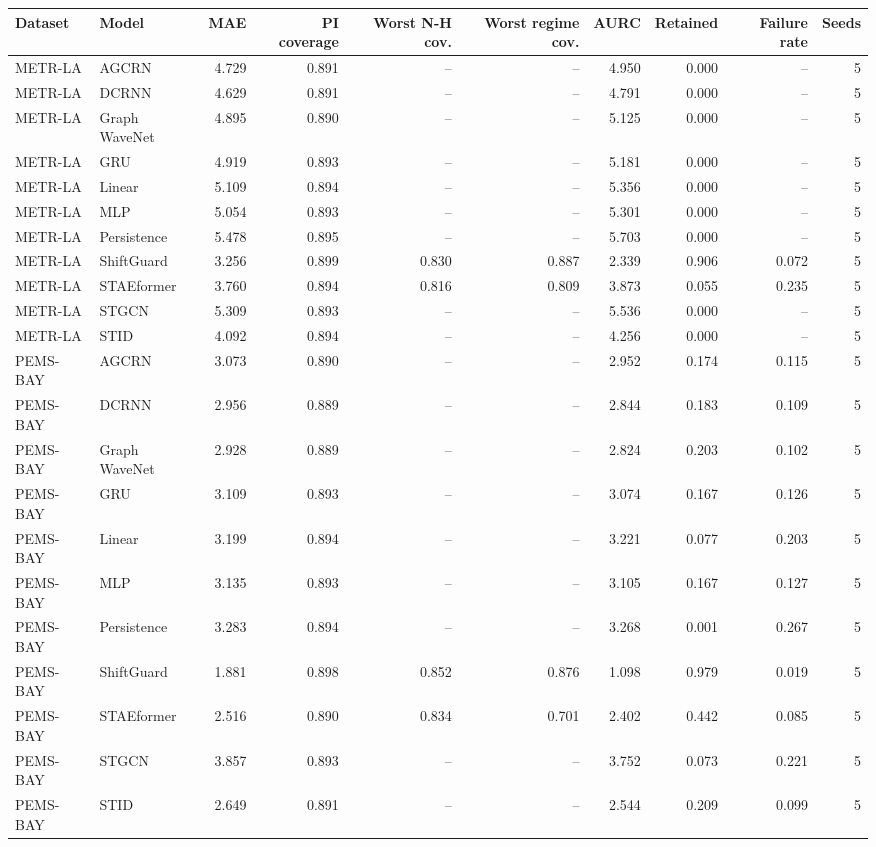 \begin{tabular}{llrrrrrrrr}
\toprule
Dataset & Model & MAE & PI coverage & Worst N-H cov. & Worst regime cov. & AURC & Retained & Failure rate & Seeds \\
\midrule
METR-LA & AGCRN & 4.729 & 0.891 & -- & -- & 4.950 & 0.000 & -- & 5 \\
METR-LA & DCRNN & 4.629 & 0.891 & -- & -- & 4.791 & 0.000 & -- & 5 \\
METR-LA & Graph WaveNet & 4.895 & 0.890 & -- & -- & 5.125 & 0.000 & -- & 5 \\
METR-LA & GRU & 4.919 & 0.893 & -- & -- & 5.181 & 0.000 & -- & 5 \\
METR-LA & Linear & 5.109 & 0.894 & -- & -- & 5.356 & 0.000 & -- & 5 \\
METR-LA & MLP & 5.054 & 0.893 & -- & -- & 5.301 & 0.000 & -- & 5 \\
METR-LA & Persistence & 5.478 & 0.895 & -- & -- & 5.703 & 0.000 & -- & 5 \\
METR-LA & ShiftGuard & 3.256 & 0.899 & 0.830 & 0.887 & 2.339 & 0.906 & 0.072 & 5 \\
METR-LA & STAEformer & 3.760 & 0.894 & 0.816 & 0.809 & 3.873 & 0.055 & 0.235 & 5 \\
METR-LA & STGCN & 5.309 & 0.893 & -- & -- & 5.536 & 0.000 & -- & 5 \\
METR-LA & STID & 4.092 & 0.894 & -- & -- & 4.256 & 0.000 & -- & 5 \\
PEMS-BAY & AGCRN & 3.073 & 0.890 & -- & -- & 2.952 & 0.174 & 0.115 & 5 \\
PEMS-BAY & DCRNN & 2.956 & 0.889 & -- & -- & 2.844 & 0.183 & 0.109 & 5 \\
PEMS-BAY & Graph WaveNet & 2.928 & 0.889 & -- & -- & 2.824 & 0.203 & 0.102 & 5 \\
PEMS-BAY & GRU & 3.109 & 0.893 & -- & -- & 3.074 & 0.167 & 0.126 & 5 \\
PEMS-BAY & Linear & 3.199 & 0.894 & -- & -- & 3.221 & 0.077 & 0.203 & 5 \\
PEMS-BAY & MLP & 3.135 & 0.893 & -- & -- & 3.105 & 0.167 & 0.127 & 5 \\
PEMS-BAY & Persistence & 3.283 & 0.894 & -- & -- & 3.268 & 0.001 & 0.267 & 5 \\
PEMS-BAY & ShiftGuard & 1.881 & 0.898 & 0.852 & 0.876 & 1.098 & 0.979 & 0.019 & 5 \\
PEMS-BAY & STAEformer & 2.516 & 0.890 & 0.834 & 0.701 & 2.402 & 0.442 & 0.085 & 5 \\
PEMS-BAY & STGCN & 3.857 & 0.893 & -- & -- & 3.752 & 0.073 & 0.221 & 5 \\
PEMS-BAY & STID & 2.649 & 0.891 & -- & -- & 2.544 & 0.209 & 0.099 & 5 \\
\bottomrule
\end{tabular}
